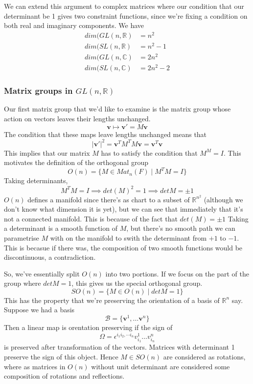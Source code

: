 \documentclass[11pt, oneside]{article}   	%
\theoremstyle{slanted}
\begin{document}
We can extend this argument to complex matrices where our condition that our determinant be 1 gives two constraint functions, since we're fixing a condition on both real and imaginary components. We have 
\begin{align*} 
dim (GL(n, \mathbb{R} ) &= n^2 \\
dim (SL(n, \mathbb{R} ) &= n^2 - 1\\
dim (GL(n, \mathbb{C} ) &= 2n^2 \\
dim (SL(n, \mathbb{C} ) &= 2n^2 - 2
\end{align*} 

\subsubsection{Matrix groups in $GL(n, \mathbb{R} )$} 
Our first matrix group that we'd like to examine is the matrix group whose action on vectors leaves their lengths unchanged.
\[ 
\mathbf{v} \mapsto \mathbf{v}' = M \mathbf{v} 
\] 
The condition that these maps leave lengths unchanged means that 
\[ 
|\mathbf{v}'|^2 = \mathbf{v}^T M^TM \mathbf{v}  = \mathbf{v}^T \mathbf{v} 
\] 
This implies that our matrix $M$ has to satisfy the condition that $M^M  = I$. This motivates the definition of the orthogonal group 
\[ 
O(n)  = \{ M \in Mat_n(F) \mid M^T M = I \} 
\] 
Taking determinants, 
\[ 
M^T M = I \implies det (M )^2 = 1 \implies det M  = \pm 1 
\] 
$O(n)$ defines a manifold since there's as chart to a subset of $\mathbb{R}^{n^2 } $ (although we don't know what dimension it is yet), but we can see that immediately that it's not a connected manifold. This is because of the fact that $det (M ) = \pm 1$ Taking a determinant is a smooth function of $M$, but there's no smooth path we can parametrise $M$ with on the manifold to swith the determinant from $+1$ to $-1$. This is becasue if there was, the composition of two smooth functions would be discontinuous, a contradiction.

So, we've essentially split $O(n)$ into two portions. If we focus on the part of the group where $det M  =1$, this gives us the special orthogonal group. 
\[ 
SO( n) = \{ M \in O(n) \mid det M  = 1\} 
\] 
This has the property that we're preserving the orientation of a basis of $\mathbb{R}^n $ say. Suppose we had a basis 
\[ 
\mathcal{B}   = \{ \mathbf{v}^1 , \dots \mathbf{v}^n \} 
\] 
Then a linear map is orentation preserving if the sign of 
\[ 
\Omega  = \epsilon^{ i_1 i_2, \cdots i_n} v^1_{i_1} \dots v^n_{i_n } 
\] 
is preserved after transformation of the vectors. Matrices with determinant 1 preserve the sign of this object. Hence $M \in SO ( n) $ are considered as rotations, where as matrices in $O ( n ) $ without unit determinant are considered some composition of rotations and reflections. 
\end{document}
